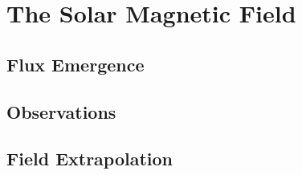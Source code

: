 
\section{The Solar Magnetic Field}


\subsection{Flux Emergence}


\subsection{Observations}


\subsection{Field Extrapolation}\label{sec:field_extrapolation}

